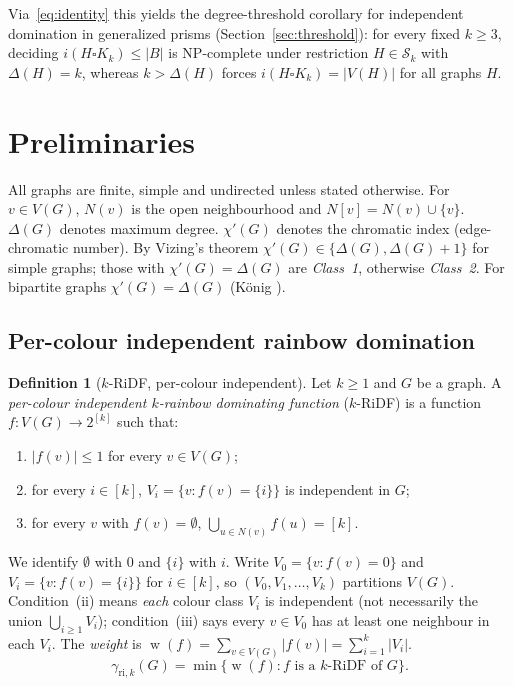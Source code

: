 \documentclass[11pt,a4paper]{article}
\theoremstyle{plain}
\theoremstyle{definition}
\newtheorem{definition}[theorem]{Definition}
\DeclareMathOperator{\weight}{w}
\newcommand{\gri}{\gamma_{\mathrm{ri},k}}
\newcommand{\cardK}{\square K_k}
\newcommand{\setK}{[k]}
\newcommand{\cS}{\mathcal{S}}
\begin{document}
Via~\eqref{eq:identity} this yields the degree-threshold corollary for independent domination in generalized prisms (Section~\ref{sec:threshold}): for every fixed $k\ge3$, deciding $i(H\cardK)\le|B|$ is NP-complete under restriction $H\in\cS_{k}$ with $\Delta(H)=k$, whereas $k>\Delta(H)$ forces $i(H\cardK)=|V(H)|$ for all graphs $H$.

\section{Preliminaries}\label{sec:prelim}

All graphs are finite, simple and undirected unless stated otherwise.
For $v\in V(G)$, $N(v)$ is the open neighbourhood and $N[v]=N(v)\cup\{v\}$.
$\Delta(G)$ denotes maximum degree. $\chi'(G)$ denotes the chromatic index (edge-chromatic number). By Vizing's theorem \cite{Vizing1964} $\chi'(G)\in\{\Delta(G),\Delta(G)+1\}$ for simple graphs; those with $\chi'(G)=\Delta(G)$ are \emph{Class~1}, otherwise \emph{Class~2}. For bipartite graphs $\chi'(G)=\Delta(G)$ (K\"onig \cite{Konig1916}).

\subsection{Per-colour independent rainbow domination}

\begin{definition}[$k$-RiDF, per-colour independent]\label{def:ridf}
Let $k\ge 1$ and $G$ be a graph.
A \emph{per-colour independent $k$-rainbow dominating function} ($k$-RiDF) is a function $f\colon V(G)\to 2^{\setK}$ such that:
\begin{enumerate}
\item[(i)] $|f(v)|\le 1$ for every $v\in V(G)$;
\item[(ii)] for every $i\in\setK$, $V_{i}=\{v:f(v)=\{i\}\}$ is independent in $G$;
\item[(iii)] for every $v$ with $f(v)=\emptyset$, $\bigcup_{u\in N(v)} f(u)=\setK$.
\end{enumerate}
We identify $\emptyset$ with $0$ and $\{i\}$ with $i$.
Write $V_{0}=\{v:f(v)=0\}$ and $V_{i}=\{v:f(v)=\{i\}\}$ for $i\in\setK$, so $(V_{0},V_{1},\dots,V_{k})$ partitions $V(G)$.
Condition~(ii) means \emph{each} colour class $V_{i}$ is independent (not necessarily the union $\bigcup_{i\ge1}V_{i}$); condition~(iii) says every $v\in V_{0}$ has at least one neighbour in each $V_{i}$.
The \emph{weight} is $\weight(f)=\sum_{v\in V(G)}|f(v)|=\sum_{i=1}^{k}|V_{i}|$.
\[
\gri(G)=\min\{\weight(f): f\text{ is a $k$-RiDF of }G\}.
\]
\end{definition}
\end{document}
